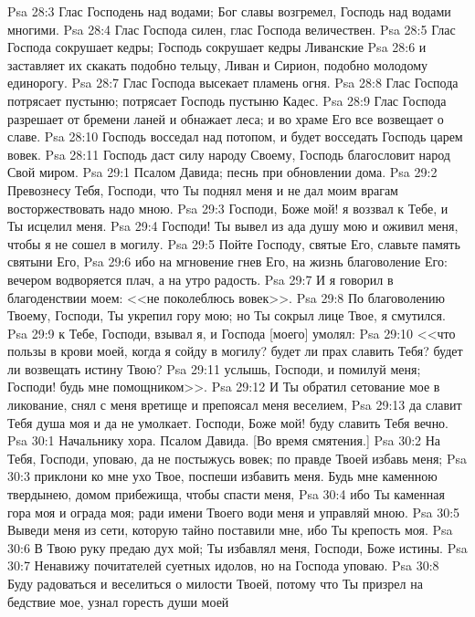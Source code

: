 \vs Psa 28:3 Глас Господень над водами; Бог славы возгремел, Господь над водами многими.
\vs Psa 28:4 Глас Господа силен, глас Господа величествен.
\vs Psa 28:5 Глас Господа сокрушает кедры; Господь сокрушает кедры Ливанские
\vs Psa 28:6 и заставляет их скакать подобно тельцу, Ливан и Сирион, подобно молодому единорогу.
\vs Psa 28:7 Глас Господа высекает пламень огня.
\vs Psa 28:8 Глас Господа потрясает пустыню; потрясает Господь пустыню Кадес.
\vs Psa 28:9 Глас Господа разрешает от бремени ланей и обнажает леса; и во храме Его все возвещает о  славе.
\vs Psa 28:10 Господь восседал над потопом, и будет восседать Господь царем вовек.
\vs Psa 28:11 Господь даст силу народу Своему, Господь благословит народ Свой миром.
\vs Psa 29:1 Псалом Давида; песнь при обновлении дома.
\rsbpar\vs Psa 29:2 Превознесу Тебя, Господи, что Ты поднял меня и не дал моим врагам восторжествовать надо мною.
\vs Psa 29:3 Господи, Боже мой! я воззвал к Тебе, и Ты исцелил меня.
\vs Psa 29:4 Господи! Ты вывел из ада душу мою и оживил меня, чтобы я не сошел в могилу.
\vs Psa 29:5 Пойте Господу, святые Его, славьте память святыни Его,
\vs Psa 29:6 ибо на мгновение гнев Его, на  жизнь благоволение Его: вечером водворяется плач, а на утро радость.
\vs Psa 29:7 И я говорил в благоденствии моем: <<не поколеблюсь вовек>>.
\vs Psa 29:8 По благоволению Твоему, Господи, Ты укрепил гору мою; но Ты сокрыл лице Твое,  я смутился.
\vs Psa 29:9  к Тебе, Господи, взывал я, и Господа [моего] умолял:
\vs Psa 29:10 <<что пользы в крови моей, когда я сойду в могилу? будет ли прах славить Тебя? будет ли возвещать истину Твою?
\vs Psa 29:11 услышь, Господи, и помилуй меня; Господи! будь мне помощником>>.
\vs Psa 29:12 И Ты обратил сетование мое в ликование, снял с меня вретище и препоясал меня веселием,
\vs Psa 29:13 да славит Тебя душа моя и да не умолкает. Господи, Боже мой! буду славить Тебя вечно.
\vs Psa 30:1 Начальнику хора. Псалом Давида. [Во время смятения.]
\rsbpar\vs Psa 30:2 На Тебя, Господи, уповаю, да не постыжусь вовек; по правде Твоей избавь меня;
\vs Psa 30:3 приклони ко мне ухо Твое, поспеши избавить меня. Будь мне каменною твердынею, домом прибежища, чтобы спасти меня,
\vs Psa 30:4 ибо Ты каменная гора моя и ограда моя; ради имени Твоего води меня и управляй мною.
\vs Psa 30:5 Выведи меня из сети, которую тайно поставили мне, ибо Ты крепость моя.
\vs Psa 30:6 В Твою руку предаю дух мой; Ты избавлял меня, Господи, Боже истины.
\vs Psa 30:7 Ненавижу почитателей суетных идолов, но на Господа уповаю.
\vs Psa 30:8 Буду радоваться и веселиться о милости Твоей, потому что Ты призрел на бедствие мое, узнал горесть души моей
